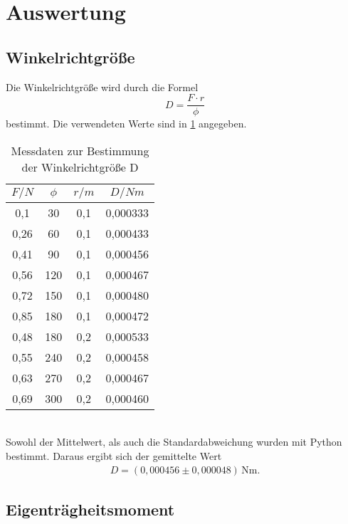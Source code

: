 \section{Auswertung}
\label{sec:Auswertung}
\subsection{Winkelrichtgröße}
Die Winkelrichtgröße wird durch die Formel
\begin{equation}
  D = \frac{F \cdot r}{\phi}
\end{equation}
bestimmt. Die verwendeten Werte sind in \ref{tab:winkelrichtgr} angegeben.
\begin{table}
  \centering
  \caption{Messdaten zur Bestimmung der Winkelrichtgröße D}
  \label{tab:winkelrichtgr}
  \begin{tabular}{c c c c}
    \toprule
    $F/N$ & $\phi$ & $r/m$ & $D/Nm$ \\
    \midrule
    0,1  &  30 & 0,1 & 0,000333\\
    0,26 &  60 & 0,1 & 0,000433\\
    0,41 &  90 & 0,1 & 0,000456\\
    0,56 & 120 & 0,1 & 0,000467\\
    0,72 & 150 & 0,1 & 0,000480\\
    0,85 & 180 & 0,1 & 0,000472\\
    0,48 & 180 & 0,2 & 0,000533\\
    0,55 & 240 & 0,2 & 0,000458\\
    0,63 & 270 & 0,2 & 0,000467\\
    0,69 & 300 & 0,2 & 0,000460\\
    \bottomrule
  \end{tabular}
\end{table}
\\Sowohl der Mittelwert, als auch die Standardabweichung wurden mit Python bestimmt. Daraus ergibt sich der
gemittelte Wert
\begin{align*}
    D = (0{,}000456 \pm 0{,}000048)\,\mathrm{Nm} .
\end{align*}

\subsection{Eigenträgheitsmoment}

